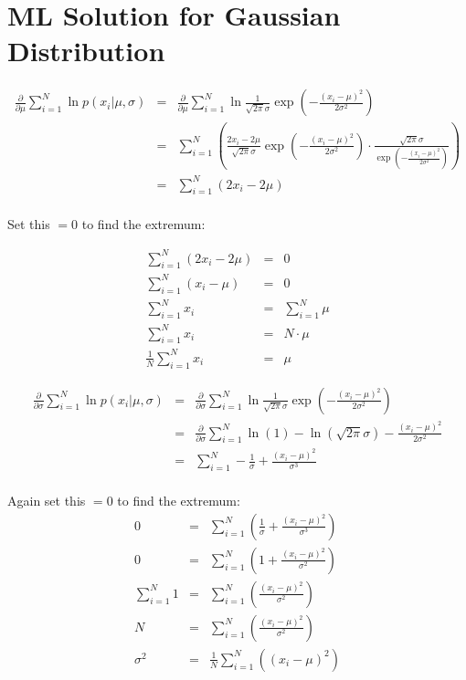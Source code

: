 \section*{ML Solution for Gaussian Distribution}

\begin{eqnarray}
    \frac{\partial}{\partial \mu} \sum_{i=1}^N \ln p(x_i|\mu, \sigma)&=& 
    \frac{\partial}{\partial \mu} \sum_{i=1}^N \ln \frac{1}{\sqrt{2 \pi} \sigma}\exp\left(-\frac{(x_i-\mu)^2}{2 \sigma^2} \right) \\
    &=& \sum_{i=1}^N  \left(\frac{2 x_i - 2 \mu }{\sqrt{2 \pi} \sigma} \exp\left(-\frac{(x_i-\mu)^2}{2 \sigma^2} \right) \cdot  \frac{\sqrt{2 \pi} \sigma}{\exp\left(-\frac{(x_i-\mu)^2}{2 \sigma^2} \right)} \right) \\
    &=& \sum_{i=1}^N  \left(2 x_i - 2 \mu \right) \\
\end{eqnarray}

Set this $=0$ to find the extremum:

\begin{eqnarray}
\sum_{i=1}^N  \left(2 x_i - 2 \mu \right)  &=& 0 \\
\sum_{i=1}^N  \left( x_i -\mu \right)  &=& 0\\
\sum_{i=1}^N  x_i  &=& \sum_{i=1}^N  \mu \\
\sum_{i=1}^N  x_i  &=& N \cdot \mu \\
 \frac{1}{N} \sum_{i=1}^N  x_i  &=& \mu 
\end{eqnarray}



\begin{eqnarray}
    \frac{\partial}{\partial \sigma} \sum_{i=1}^N \ln p(x_i|\mu, \sigma)&=& 
    \frac{\partial}{\partial \sigma} \sum_{i=1}^N \ln \frac{1}{\sqrt{2 \pi} \sigma}\exp\left(-\frac{(x_i-\mu)^2}{2 \sigma^2} \right) \\
    &=& \frac{\partial}{\partial \sigma} \sum_{i=1}^N \ln(1) - \ln( \sqrt{2 \pi} \sigma) -\frac{(x_i-\mu)^2}{2 \sigma^2} \\
    &=& \sum_{i=1}^N - \frac{1}{\sigma} + \frac{(x_i-\mu)^2}{\sigma^3} \\    
\end{eqnarray}

Again set this $=0$ to find the extremum:
\begin{eqnarray}
    0 &=& \sum_{i=1}^N \left( \frac{1}{\sigma} + \frac{(x_i-\mu)^2}{\sigma^3}\right)\\
    0 &=& \sum_{i=1}^N \left( 1 + \frac{(x_i-\mu)^2}{\sigma^2}\right)\\
    \sum_{i=1}^N 1 &=& \sum_{i=1}^N \left( \frac{(x_i-\mu)^2}{\sigma^2}\right)\\
    N &=& \sum_{i=1}^N \left( \frac{(x_i-\mu)^2}{\sigma^2}\right)\\
    \sigma^2 &=& \frac{1}{N}\sum_{i=1}^N \left( (x_i-\mu)^2\right)
\end{eqnarray}


